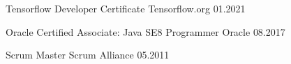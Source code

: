 

\begin{cvhonors}


    \cvhonor
    {Tensorflow Developer Certificate} %
    {} %
    {Tensorflow.org} %
    {01.2021} %

    \cvhonor
    {Oracle Certified Associate: Java SE8 Programmer} %
    {} %
    {Oracle} %
    {08.2017} %

    \cvhonor
    {Scrum Master} %
    {} %
    {Scrum Alliance} %
    {05.2011} %

\end{cvhonors}
